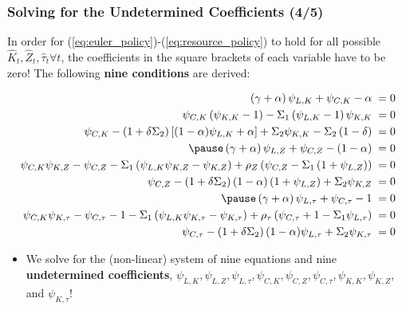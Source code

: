 \documentclass[10pt,c,aspectratio=1610,handout]{beamer}
\begin{document}
\begin{frame}%
  \frametitle{Solving for the Undetermined Coefficients (4/5)}%
  In order for (\ref{eq:euler_policy})-(\ref{eq:resource_policy}) to hold for all possible $\hat{K}_t, \hat{Z}_{t}, \hat{\tau}_{t} \forall t$, the coefficients in the square brackets of each variable have to be zero! The following \textbf{nine conditions} are derived:%
  \begin{small}%
    \begin{align}%
      \left(\gamma+\alpha\right) \psi_{L,K} + \psi_{C,K} - \alpha \; = & \; 0\label{udc:labor_capital}\\%
      \psi_{C,K} \left( \psi_{K,K} - 1 \right) - \Sigma_1 \left( \psi_{L,K} - 1 \right) \psi_{K,K} \; = & \; 0\label{udc:capital_capital}\\%
      \psi_{C,K} - \left(1+\delta \Sigma_2\right)\left[(1-\alpha) \psi_{L,K} + \alpha\right] + \Sigma_2 \psi_{K,K} - \Sigma_2 \left(1-\delta\right) \; = & \; 0\label{udc:consumption_capital}\\%
      \pause%
      \left(\gamma+\alpha\right) \psi_{L,Z} + \psi_{C,Z} - \left(1-\alpha\right) \; = & \; 0\label{udc:labor_ar1}\\%
      \psi_{C,K} \psi_{K,Z} - \psi_{C,Z} - \Sigma_1 \left(\psi_{L,K} \psi_{K,Z} - \psi_{K,Z} \right) + \rho_Z \left(\psi_{C,Z} - \Sigma_1 \left(1+\psi_{L,Z}\right) \right) \; = & \; 0\label{udc:capital_ar1}\\%
      \psi_{C,Z} - \left(1+\delta \Sigma_2\right)(1-\alpha)\left(1+\psi_{L,Z}\right) + \Sigma_2 \psi_{K,Z} \; = & \; 0\label{udc:consumption_ar1}\\%
      \pause%
      \left(\gamma+\alpha\right) \psi_{L,\tau} + \psi_{C,\tau} - 1 \; = & \; 0\label{udc:labor_shock}\\%
      \psi_{C,K} \psi_{K,\tau} - \psi_{C,\tau} - 1 - \Sigma_1 \left( \psi_{L,K} \psi_{K,\tau} - \psi_{K,\tau} \right) + \rho_\tau \left( \psi_{C,\tau} + 1 - \Sigma_1 \psi_{L,\tau} \right) \; = & \; 0\label{udc:capital_shock}\\%
      \psi_{C,\tau} - \left(1+\delta \Sigma_2\right)(1-\alpha) \psi_{L,\tau} + \Sigma_2 \psi_{K,\tau} \; = & \; 0\label{udc:consumption_shock}%
    \end{align}%
  \end{small}%
  \vspace*{-0.2in}%
  \begin{itemize}%
    \item[$\Rightarrow$] We solve for the (non-linear) system of nine equations and nine \textbf{undetermined coefficients}, $\psi_{L,K}, \psi_{L,Z}, \psi_{L,\tau}, \psi_{C,K}, \psi_{C,Z}, \psi_{C,\tau}, \psi_{K,K}, \psi_{K,Z}$, and $\psi_{K,\tau}$!%
  \end{itemize}%
\end{frame}%
\end{document}
